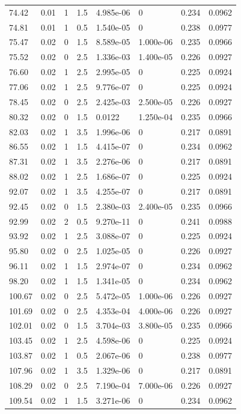 \documentclass[preview]{standalone}
\begin{document}
{{{\begin{tabular}{L{1.2cm}C{1.2cm} C{0.3cm}C{0.5cm} C{1.4cm}C{1.4cm} C{1.4cm}C{1.4cm}}
  74.42  &  0.01  & 1     & 1.5 &  4.985e-06  & 0  & 0.234 &  0.0962   \\ 
  74.81  &  0.01  & 1     & 0.5 &  1.540e-05  & 0  & 0.238 &  0.0977   \\ 
  75.47  &  0.02  & 0     & 1.5 &  8.589e-05  & 1.000e-06  & 0.235 &  0.0966   \\ 
  75.52  &  0.02  & 0     & 2.5 &  1.336e-03  & 1.400e-05  & 0.226 &  0.0927   \\ 
  76.60  &  0.02  & 1     & 2.5 &  2.995e-05  & 0  & 0.225 &  0.0924   \\ 
  77.06  &  0.02  & 1     & 2.5 &  9.776e-07  & 0  & 0.225 &  0.0924   \\ 
  78.45  &  0.02  & 0     & 2.5 &  2.425e-03  & 2.500e-05  & 0.226 &  0.0927   \\ 
  80.32  &  0.02  & 0     & 1.5 &  0.0122  & 1.250e-04  & 0.235 &  0.0966   \\ 
  82.03  &  0.02  & 1     & 3.5 &  1.996e-06  & 0  & 0.217 &  0.0891   \\ 
  86.55  &  0.02  & 1     & 1.5 &  4.415e-07  & 0  & 0.234 &  0.0962   \\ 
  87.31  &  0.02  & 1     & 3.5 &  2.276e-06  & 0  & 0.217 &  0.0891   \\ 
  88.02  &  0.02  & 1     & 2.5 &  1.686e-07  & 0  & 0.225 &  0.0924   \\ 
  92.07  &  0.02  & 1     & 3.5 &  4.255e-07  & 0  & 0.217 &  0.0891   \\ 
  92.45  &  0.02  & 0     & 1.5 &  2.380e-03  & 2.400e-05  & 0.235 &  0.0966   \\ 
  92.99  &  0.02  & 2     & 0.5 &  9.270e-11  & 0  & 0.241 &  0.0988   \\ 
  93.92  &  0.02  & 1     & 2.5 &  3.088e-07  & 0  & 0.225 &  0.0924   \\ 
  95.80  &  0.02  & 0     & 2.5 &  1.025e-05  & 0  & 0.226 &  0.0927   \\ 
  96.11  &  0.02  & 1     & 1.5 &  2.974e-07  & 0  & 0.234 &  0.0962   \\ 
  98.20  &  0.02  & 1     & 1.5 &  1.341e-05  & 0  & 0.234 &  0.0962   \\ 
  100.67  &  0.02  & 0     & 2.5 &  5.472e-05  & 1.000e-06  & 0.226 &  0.0927   \\ 
  101.69  &  0.02  & 0     & 2.5 &  4.353e-04  & 4.000e-06  & 0.226 &  0.0927   \\ 
  102.01  &  0.02  & 0     & 1.5 &  3.704e-03  & 3.800e-05  & 0.235 &  0.0966   \\ 
  103.45  &  0.02  & 1     & 2.5 &  4.598e-06  & 0  & 0.225 &  0.0924   \\ 
  103.87  &  0.02  & 1     & 0.5 &  2.067e-06  & 0  & 0.238 &  0.0977   \\ 
  107.96  &  0.02  & 1     & 3.5 &  1.329e-06  & 0  & 0.217 &  0.0891   \\ 
  108.29  &  0.02  & 0     & 2.5 &  7.190e-04  & 7.000e-06  & 0.226 &  0.0927   \\ 
  109.54  &  0.02  & 1     & 1.5 &  3.271e-06  & 0  & 0.234 &  0.0962   \\ 
\hline 
\end{tabular} 

}}}
\end{document}
